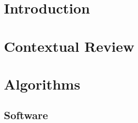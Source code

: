 
\part*{Introduction}\label{part:intro}

\part{Contextual Review}\label{part:contextual_review}

\part{Algorithms}\label{part:algorithms}
    \chapter{Software}\label{chapter:sw}
        

